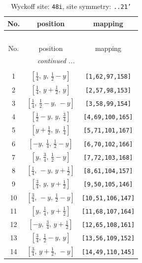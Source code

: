 \documentclass[fleqn,8pt]{jsarticle}
\begin{document}
\begin{longtable}{ccc}
\caption{Wyckoff site: {\tt 48i}, site symmetry: {\tt ..21'}}
 \\
 \hline \hline
No. & position & mapping \\ \hline \endfirsthead

\multicolumn{2}{l}{\tablename\ \thetable{}} \\
 \hline \hline
No. & position & mapping \\ \hline \endhead

 \hline \hline
\multicolumn{2}{r}{\footnotesize\it continued ...} \\ \endfoot

 \hline \hline
\multicolumn{2}{r}{} \\ \endlastfoot

1 & $\left[ \frac{1}{4},\, y,\, \frac{1}{2} - y \right]$ & {\tt [1,62,97,158]} \\ \hline
2 & $\left[ \frac{1}{4},\, y + \frac{1}{2},\, y \right]$ & {\tt [2,57,98,153]} \\ \hline
3 & $\left[ \frac{1}{4},\, \frac{1}{2} - y,\, - y \right]$ & {\tt [3,58,99,154]} \\ \hline
4 & $\left[ \frac{1}{2} - y,\, y,\, \frac{3}{4} \right]$ & {\tt [4,69,100,165]} \\ \hline
5 & $\left[ y + \frac{1}{2},\, y,\, \frac{1}{4} \right]$ & {\tt [5,71,101,167]} \\ \hline
6 & $\left[ - y,\, \frac{1}{4},\, \frac{1}{2} - y \right]$ & {\tt [6,70,102,166]} \\ \hline
7 & $\left[ y,\, \frac{3}{4},\, \frac{1}{2} - y \right]$ & {\tt [7,72,103,168]} \\ \hline
8 & $\left[ \frac{1}{4},\, - y,\, y + \frac{1}{2} \right]$ & {\tt [8,61,104,157]} \\ \hline
9 & $\left[ \frac{3}{4},\, y,\, y + \frac{1}{2} \right]$ & {\tt [9,50,105,146]} \\ \hline
10 & $\left[ \frac{3}{4},\, - y,\, \frac{1}{2} - y \right]$ & {\tt [10,51,106,147]} \\ \hline
11 & $\left[ y,\, \frac{1}{4},\, y + \frac{1}{2} \right]$ & {\tt [11,68,107,164]} \\ \hline
12 & $\left[ - y,\, \frac{3}{4},\, y + \frac{1}{2} \right]$ & {\tt [12,65,108,161]} \\ \hline
13 & $\left[ \frac{3}{4},\, \frac{1}{2} - y,\, y \right]$ & {\tt [13,56,109,152]} \\ \hline
14 & $\left[ \frac{3}{4},\, y + \frac{1}{2},\, - y \right]$ & {\tt [14,49,110,145]} \\ \hline

\end{longtable}
\end{document}
